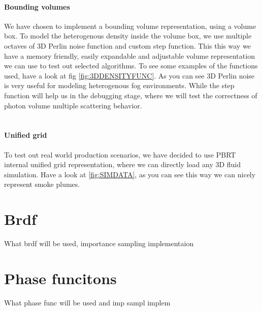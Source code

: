 \paragraph*{Bounding volumes}
We have chosen to implement a bounding volume representation, using a volume box. To model the heterogenous density inside the volume box, we use multiple octaves of 3D Perlin noise function and custom step function. This this way we have a memory friendly, easily expandable and adjustable volume representation we can use to test out selected algorithms. To see some examples of the functions used, have a look at fig \ref{fig:3DDENSITYFUNC}. As you can see 3D Perlin noise is very useful for modeling heterogenous fog environments. While the step function will help us in the debugging stage, where we will test the correctness of photon volume multiple scattering behavior.
\\
\\
\paragraph*{Unified grid}
To test out real world production scenarios, we have decided to use PBRT internal unified grid representation, where we can directly load any 3D fluid simulation. Have a look at \ref{fig:SIMDATA}, as you can see this way we can nicely represent smoke plumes.



\section{Brdf}
What brdf will be used, importance sampling implementaion

\section{Phase funcitons}
What phase func will be used and imp sampl implem 


